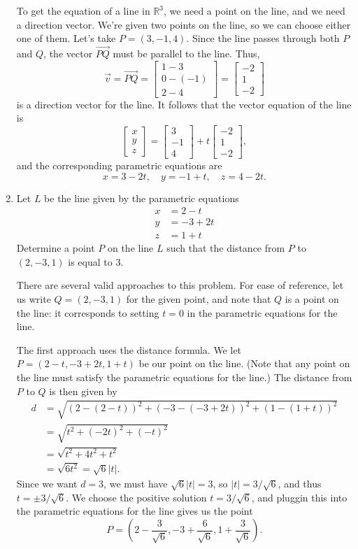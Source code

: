 \documentclass[12pt]{article}
\newcommand{\abs}[1]{\lvert #1\rvert}
\newcommand{\R}{\mathbb{R}}
\newcommand{\bbm}{\begin{bmatrix}}
\newcommand{\ebm}{\end{bmatrix}}
\begin{document}
\begin{enumerate}
To get the equation of a line in $\R^3$, we need a point on the line, and we need a direction vector. We're given two points on the line, so we can choose either one of them. Let's take $P=(3,-1,4)$. Since the line passes through both $P$ and $Q$, the vector $\overrightarrow{PQ}$ must be parallel to the line. Thus,
\[
 \vec{v} = \overrightarrow{PQ} = \bbm 1-3\\0-(-1)\\2-4\ebm = \bbm -2\\1\\-2\ebm
\]
is a direction vector for the line. It follows that the vector equation of the line is
\[
 \bbm x\\y\\z\ebm = \bbm 3\\-1\\4\ebm + t\bbm -2\\1\\-2\ebm,
\]
and the corresponding parametric equations are
\[
 x = 3-2t,\quad y = -1+t,\quad z = 4-2t.
\]


\item Let $L$ be the line given by the parametric equations
\begin{align*}
 x&=2-t\\
 y&=-3+2t\\
 z&=1+t
\end{align*}
Determine a point $P$ on the line $L$ such that the distance from $P$ to $(2,-3,1)$ is equal to 3.

\bigskip

There are several valid approaches to this problem. For ease of reference, let us write $Q=(2,-3,1)$ for the given point, and note that $Q$ is a point on the line: it corresponds to setting $t=0$ in the parametric equations for the line.

The first approach uses the distance formula. We let $P=(2-t,-3+2t,1+t)$ be our point on the line. (Note that any point on the line must satisfy the parametric equations for the line.) The distance from $P$ to $Q$ is then given by
\begin{align*}
 d & = \sqrt{(2-(2-t))^2 + (-3-(-3+2t))^2 + (1-(1+t))^2}\\
 & = \sqrt{t^2+(-2t)^2+(-t)^2}\\
 & = \sqrt{t^2+4t^2+t^2}\\
 & = \sqrt{6t^2} = \sqrt{6}\abs{t}.
\end{align*}
Since we want $d=3$, we must have $\sqrt{6}\abs{t}=3$, so $\abs{t} = 3/\sqrt{6}$, and thus $t = \pm 3/\sqrt{6}$. We choose the positive solution $t=3/\sqrt{6}$, and pluggin this into the parametric equations for the line gives us the point
\[
 P = \left(2-\frac{3}{\sqrt{6}}, -3+\frac{6}{\sqrt{6}}, 1+\frac{3}{\sqrt{6}}\right).
\]


\end{enumerate}
\end{document}
